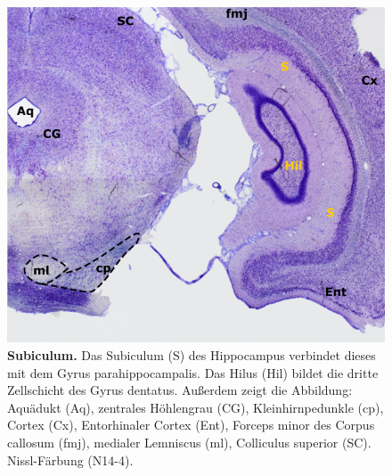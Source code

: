 \begin{figure}[H]
    \centering
    \includegraphics{pictures/Basalganglia/Subiculum.png}
    \caption[Subiculum]{\textbf{Subiculum.} Das Subiculum (S) des Hippocampus verbindet dieses mit dem Gyrus parahippocampalis. Das Hilus (Hil) bildet die dritte Zellschicht des Gyrus dentatus. Außerdem zeigt die Abbildung: 
    Aquädukt (Aq), zentrales Höhlengrau (CG), Kleinhirnpedunkle (cp), Cortex (Cx), Entorhinaler Cortex (Ent), Forceps minor des Corpus callosum (fmj), medialer Lemniscus (ml), Colliculus superior (SC). Nissl-Färbung (N14-4).}
    \label{fig:hippo_subiculum}
\end{figure}

